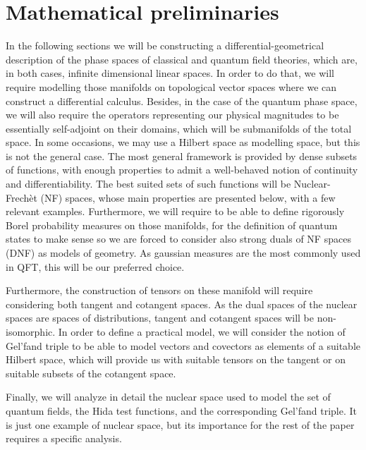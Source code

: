 \documentclass[12pt]{article}%
\begin{document}
\section{Mathematical preliminaries}
\label{sec:math_preliminaries}
In the following sections we will be constructing a differential-geometrical description of the phase spaces of classical and quantum field theories, which are, in both cases, infinite dimensional linear spaces. In order to do that, we will require modelling those manifolds on topological vector spaces where we can construct a differential calculus. Besides, in the case of the quantum phase space, we will also require the operators representing our physical magnitudes to be essentially self-adjoint on their domains, which will be submanifolds of the total space.  In some occasions, we may use a Hilbert space as modelling space, but this is not the general case. The most general framework is provided by dense subsets of functions, with enough properties to admit a well-behaved notion of continuity and differentiability. The best suited sets of such functions will be Nuclear-Frechèt (NF) spaces, whose main properties are presented below, with a few relevant examples. Furthermore, we will require to be able to define rigorously Borel probability measures on those manifolds, for the definition of quantum states to make sense so we are forced to consider also strong duals of NF spaces (DNF) as models of geometry. As gaussian measures are the most commonly used in QFT, this will be our preferred choice. 

Furthermore, the construction of tensors on these manifold will require considering both tangent and cotangent spaces. As the dual spaces of the nuclear spaces are spaces of distributions, tangent and cotangent spaces will be  non-isomorphic. In order to define a practical model, we will consider the notion of Gel'fand triple to be able to model vectors and covectors as elements of a suitable Hilbert space, which will provide us with suitable tensors on the tangent or on suitable subsets of the cotangent space. 

Finally, we will analyze in detail the nuclear space used to model the set of quantum fields, the Hida test functions, and the corresponding Gel'fand triple. It is just one example of nuclear space, but its importance for the rest of the paper requires a specific analysis. 

\end{document}
